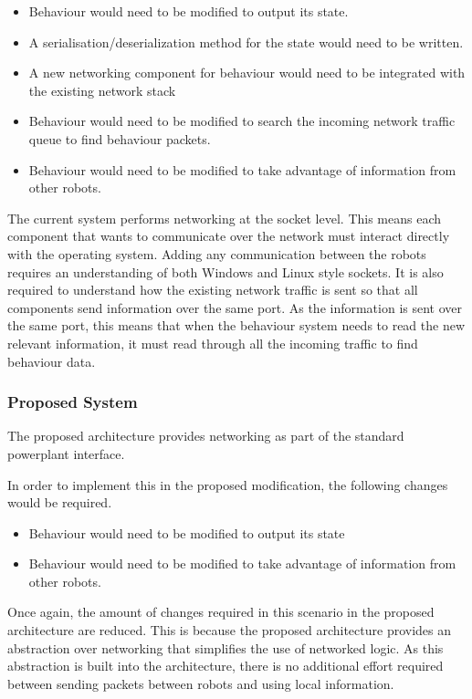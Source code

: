 \documentclass[english,12pt]{scrartcl}
\begin{document}
				\begin{itemize}
					\item Behaviour would need to be modified to output its state.
					\item A serialisation/deserialization method for the state would need to be written.
					\item A new networking component for behaviour would need to be integrated with the existing network stack
					\item Behaviour would need to be modified to search the incoming network traffic queue to find behaviour packets.
					\item Behaviour would need to be modified to take advantage of information from other robots.
				\end{itemize}
				
				The current system performs networking at the socket level.
				This means each component that wants to communicate over the network must interact directly with the operating system.
				Adding any communication between the robots requires an understanding of both Windows and Linux style sockets.
				It is also required to understand how the existing network traffic is sent so that all components send information over the same port.
				As the information is sent over the same port, this means that when the behaviour system needs to read the new relevant information, it must read through all the incoming traffic to find behaviour data.
				
			\subsubsection{Proposed System}
				The proposed architecture provides networking as part of the standard \gls{powerplant} interface.
				
				In order to implement this in the proposed modification, the following changes would be required.
				
				\begin{itemize}
					\item Behaviour would need to be modified to output its state
					\item Behaviour would need to be modified to take advantage of information from other robots.
				\end{itemize}
				
				Once again, the amount of changes required in this scenario in the proposed architecture are reduced.
				This is because the proposed architecture provides an abstraction over networking that simplifies the use of networked logic.
				As this abstraction is built into the architecture, there is no additional effort required between sending packets between robots and using local information.
				
\end{document}

